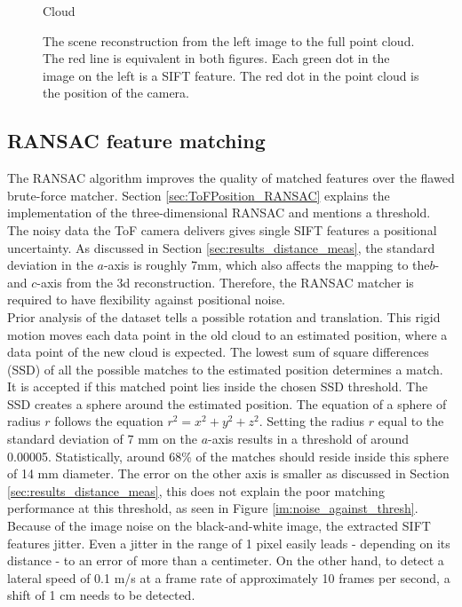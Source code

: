 \begin{figure}[H]
\begin{minipage}[b]{0.45\textwidth}
      \caption{Cloud}
      \label{fig:linearity3d_cloud} 
    \end{minipage}
    \caption{The scene reconstruction from the left image to the full point cloud. The red line is equivalent in both figures. Each green dot in the image on the left is a SIFT feature. The red dot in the point cloud is the position of the camera.}
    \label{fig:linearity3d}
  \end{figure}
\subsection{RANSAC feature matching}
\label{sec:RANSAC_Results}
The RANSAC algorithm improves the quality of matched features over the flawed brute-force matcher. Section \ref{sec:ToFPosition_RANSAC} explains the implementation of the three-dimensional RANSAC and mentions a threshold. The noisy data the ToF camera delivers gives single SIFT features a positional uncertainty. As discussed in Section \ref{sec:results_distance_meas}, the standard deviation in the $a$-axis is roughly 7mm, which also affects the mapping to the$b$- and $c$-axis from the 3d reconstruction. Therefore, the RANSAC matcher is required to have flexibility against positional noise.\\
Prior analysis of the dataset tells a possible rotation and translation. This rigid motion moves each data point in the old cloud to an estimated position, where a data point of the new cloud is expected.  The lowest sum of square differences (SSD) of all the possible matches to the estimated position determines a match. It is accepted if this matched point lies inside the chosen SSD threshold. 
The SSD creates a sphere around the estimated position. The equation of a sphere of radius $r$ follows the equation $r^{2}=x^{2}+y^{2}+z^{2}$. Setting the radius $r$ equal to the standard deviation of 7 mm on the $a$-axis results in a threshold of around 0.00005. Statistically, around 68\% of the matches should reside inside this sphere of 14 mm diameter. The error on the other axis is smaller as discussed in Section \ref{sec:results_distance_meas}, this does not explain the poor matching performance at this threshold, as seen in Figure \ref{im:noise_against_thresh}. Because of the image noise on the black-and-white image, the extracted SIFT features jitter. Even a jitter in the range of 1 pixel easily leads - depending on its distance - to an error of more than a centimeter. On the other hand, to detect a lateral speed of 0.1 m/s at a frame rate of approximately 10 frames per second, a shift of 1 cm needs to be detected.
